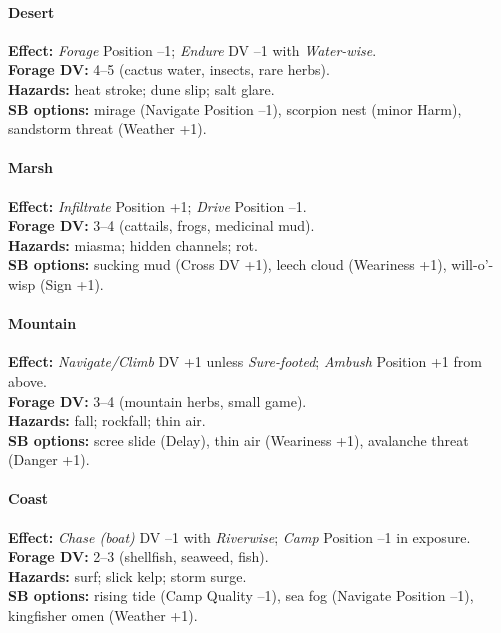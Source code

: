 \documentclass[11pt]{article}
\begin{document}
\paragraph{Desert}
\textbf{Effect:} \emph{Forage} Position --1; \emph{Endure} DV --1 with \emph{Water-wise}.\\
\textbf{Forage DV:} 4--5 (cactus water, insects, rare herbs).\\
\textbf{Hazards:} heat stroke; dune slip; salt glare.\\
\textbf{SB options:} mirage (Navigate Position --1), scorpion nest (minor Harm), sandstorm threat (Weather +1).

\paragraph{Marsh}
\textbf{Effect:} \emph{Infiltrate} Position +1; \emph{Drive} Position --1.\\
\textbf{Forage DV:} 3--4 (cattails, frogs, medicinal mud).\\
\textbf{Hazards:} miasma; hidden channels; rot.\\
\textbf{SB options:} sucking mud (Cross DV +1), leech cloud (Weariness +1), will-o'-wisp (Sign +1).

\paragraph{Mountain}
\textbf{Effect:} \emph{Navigate/Climb} DV +1 unless \emph{Sure-footed}; \emph{Ambush} Position +1 from above.\\
\textbf{Forage DV:} 3--4 (mountain herbs, small game).\\
\textbf{Hazards:} fall; rockfall; thin air.\\
\textbf{SB options:} scree slide (Delay), thin air (Weariness +1), avalanche threat (Danger +1).

\paragraph{Coast}
\textbf{Effect:} \emph{Chase (boat)} DV --1 with \emph{Riverwise}; \emph{Camp} Position --1 in exposure.\\
\textbf{Forage DV:} 2--3 (shellfish, seaweed, fish).\\
\textbf{Hazards:} surf; slick kelp; storm surge.\\
\textbf{SB options:} rising tide (Camp Quality --1), sea fog (Navigate Position --1), kingfisher omen (Weather +1).
\end{document}
